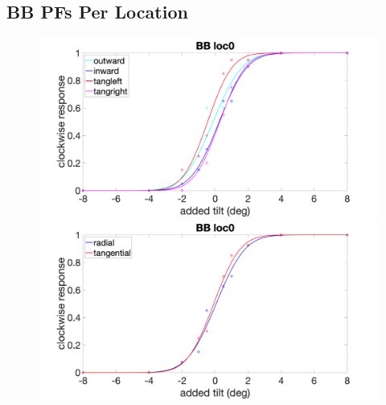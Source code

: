 \documentclass[11pt]{article} %
\begin{document}
\subsection{BB PFs Per Location}
\begin{figure}[H]
\centering %
\includegraphics[scale=.15]{Images/BB_PF_loc0_4conds.png}
\includegraphics[scale=.15]{Images/BB_PF_loc0_2conds.png}
\end{figure}
\end{document}
